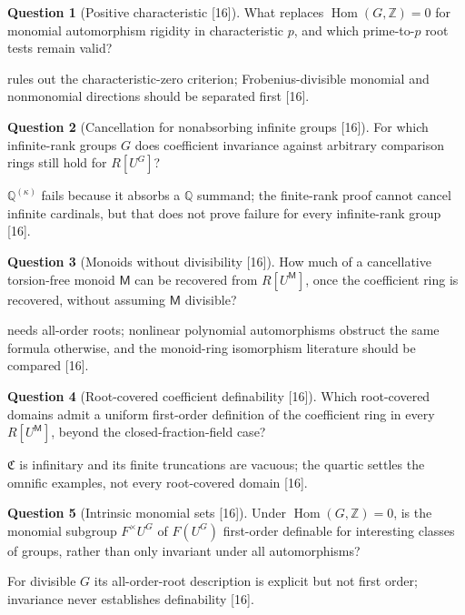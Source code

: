 \documentclass[11pt,oneside]{article}
\numberwithin{equation}{section}
\theoremstyle{definition}
\newtheorem{question}[question]{Question}
\theoremstyle{remark}
\newcommand{\Q}{\mathbb Q}
\newcommand{\Z}{\mathbb Z}
\newcommand{\Hom}{\operatorname{Hom}}
\newcommand{\src}[1]{\textup{\textsf{\small[#1]}}}
\begin{document}
\begin{question}[Positive characteristic \src{16}]\label{opa:cr:q:charp}
What replaces $\Hom(G,\Z)=0$ for monomial automorphism rigidity in characteristic $p$, and which prime-to-$p$ root tests remain
valid?
\end{question}
 rules out the characteristic-zero criterion; Frobenius-divisible monomial and nonmonomial directions should
be separated first \src{16}.

\begin{question}[Cancellation for nonabsorbing infinite groups \src{16}]\label{opa:cr:q:nonabsorbing}
For which infinite-rank groups $G$ does coefficient invariance against arbitrary comparison rings still hold for $R[U^G]$?
\end{question}
$\Q^{(\kappa)}$ fails because it absorbs a $\Q$ summand; the finite-rank proof cannot cancel infinite cardinals, but that does not
prove failure for every infinite-rank group \src{16}.

\begin{question}[Monoids without divisibility \src{16}]\label{opa:cr:q:monoids}
How much of a cancellative torsion-free monoid $\mathsf M$ can be recovered from $R[U^{\mathsf M}]$, once the coefficient ring is
recovered, without assuming $\mathsf M$ divisible?
\end{question}
 needs all-order roots; nonlinear polynomial automorphisms obstruct the same formula otherwise, and the
monoid-ring isomorphism literature should be compared \src{16}.

\begin{question}[Root-covered coefficient definability \src{16}]\label{opa:cr:q:definability}
Which root-covered domains admit a uniform first-order definition of the coefficient ring in every $R[U^{\mathsf M}]$, beyond the
closed-fraction-field case?
\end{question}
$\mathfrak C$ is infinitary and its finite truncations are vacuous; the quartic settles the omnific examples, not every root-covered
domain \src{16}.

\begin{question}[Intrinsic monomial sets \src{16}]\label{opa:cr:q:monomialsets}
Under $\Hom(G,\Z)=0$, is the monomial subgroup $F^\times U^G$ of $F(U^G)$ first-order definable for interesting classes of groups,
rather than only invariant under all automorphisms?
\end{question}
For divisible $G$ its all-order-root description is explicit but not first order; invariance never establishes
definability \src{16}.
\end{document}
